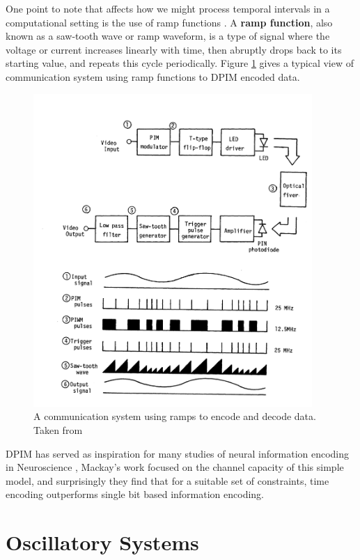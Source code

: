 \documentclass{article}
\begin{document}
One point to note that affects how we might process temporal intervals in a computational setting is the use of ramp functions \cite{sato1978pulse}. A \textbf{ramp function}, also known as a saw-tooth wave or ramp waveform, is a type of signal where the voltage or current increases linearly with time, then abruptly drops back to its starting value, and repeats this cycle periodically. Figure \ref{fig:pim} gives a typical view of communication system using ramp functions to DPIM encoded data.

\begin{figure}[ht]
	\centerline{\includegraphics[width=300pt]{figures/PIM.png}}
	\caption{A communication system using ramps to encode and decode data. Taken from \cite{sato1978pulse}}\label{fig:pim}
\end{figure}

DPIM has served as inspiration for many studies of neural information encoding in Neuroscience \cite{meister1999neural} \cite{rieke1995naturalistic} \cite{borst1999information}, Mackay's work \cite{MacKay1952} focused on the channel capacity of this simple model, and surprisingly they find that for a suitable set of constraints, time encoding outperforms single bit based information encoding.

\section{Oscillatory Systems}\label{oscil}
\end{document}
